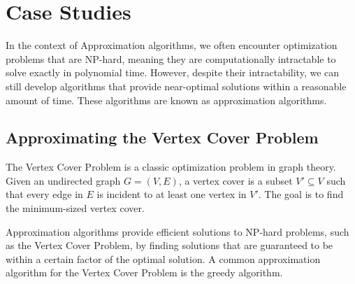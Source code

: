 \documentclass[12pt]{book} %
\begin{document}
\section{Case Studies}

In the context of Approximation algorithms, we often encounter optimization problems that are NP-hard, meaning they are computationally intractable to solve exactly in polynomial time. However, despite their intractability, we can still develop algorithms that provide near-optimal solutions within a reasonable amount of time. These algorithms are known as approximation algorithms.

\subsection{Approximating the Vertex Cover Problem}

The Vertex Cover Problem is a classic optimization problem in graph theory. Given an undirected graph \( G = (V, E) \), a vertex cover is a subset \( V' \subseteq V \) such that every edge in \( E \) is incident to at least one vertex in \( V' \). The goal is to find the minimum-sized vertex cover.


Approximation algorithms provide efficient solutions to NP-hard problems, such as the Vertex Cover Problem, by finding solutions that are guaranteed to be within a certain factor of the optimal solution. A common approximation algorithm for the Vertex Cover Problem is the greedy algorithm.
\end{document}
